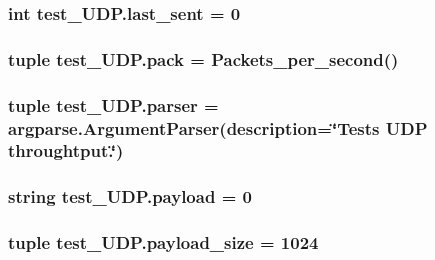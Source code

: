 \subsubsection[{last\+\_\+sent}]{\setlength{\rightskip}{0pt plus 5cm}int test\+\_\+\+U\+D\+P.\+last\+\_\+sent = 0}\label{namespacetest__UDP_a5d7f02fdec28b4a2af6d80dde2c76ca2}
\hypertarget{namespacetest__UDP_a76aeca11133e21594b834905047fe718}{}
\subsubsection[{pack}]{\setlength{\rightskip}{0pt plus 5cm}tuple test\+\_\+\+U\+D\+P.\+pack = {\bf Packets\+\_\+per\+\_\+second}()}\label{namespacetest__UDP_a76aeca11133e21594b834905047fe718}
\hypertarget{namespacetest__UDP_a7537a713586823b178eb1a1ef12ef497}{}
\subsubsection[{parser}]{\setlength{\rightskip}{0pt plus 5cm}tuple test\+\_\+\+U\+D\+P.\+parser = argparse.\+Argument\+Parser(description=\char`\"{}Tests U\+D\+P throughtput.\char`\"{})}\label{namespacetest__UDP_a7537a713586823b178eb1a1ef12ef497}
\hypertarget{namespacetest__UDP_a9635e7f3684244fc143d7aa65615e8d9}{}
\subsubsection[{payload}]{\setlength{\rightskip}{0pt plus 5cm}string test\+\_\+\+U\+D\+P.\+payload = \textquotesingle{}0\textquotesingle{}}\label{namespacetest__UDP_a9635e7f3684244fc143d7aa65615e8d9}
\hypertarget{namespacetest__UDP_acea780f1c19f5b55cfc6600c36709e50}{}
\subsubsection[{payload\+\_\+size}]{\setlength{\rightskip}{0pt plus 5cm}tuple test\+\_\+\+U\+D\+P.\+payload\+\_\+size = 1024}\label{namespacetest__UDP_acea780f1c19f5b55cfc6600c36709e50}
\hypertarget{namespacetest__UDP_a71a28a5e1d87bb9d20b4860f8c1ae9e5}{}

